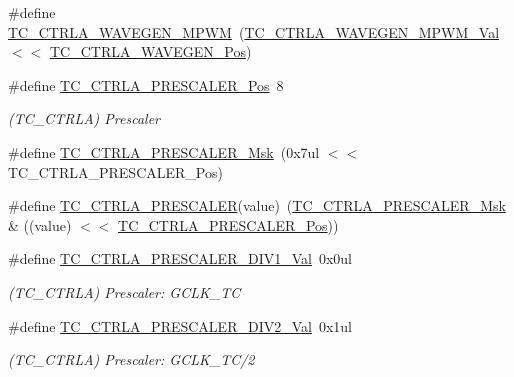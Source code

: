 \begin{DoxyCompactItemize}
\item 
\#define \mbox{\hyperlink{group___s_a_m_d21___t_c_gac9b02e2cfc519e0fc97c3b89efdc7be1}{T\+C\+\_\+\+C\+T\+R\+L\+A\+\_\+\+W\+A\+V\+E\+G\+E\+N\+\_\+\+M\+P\+WM}}~(\mbox{\hyperlink{group___s_a_m_d21___t_c_ga623755d8df9cf3e2381961022ac85349}{T\+C\+\_\+\+C\+T\+R\+L\+A\+\_\+\+W\+A\+V\+E\+G\+E\+N\+\_\+\+M\+P\+W\+M\+\_\+\+Val}}     $<$$<$ \mbox{\hyperlink{group___s_a_m_d21___t_c_gaba0fb608da3c78b2792cbc1be030ab27}{T\+C\+\_\+\+C\+T\+R\+L\+A\+\_\+\+W\+A\+V\+E\+G\+E\+N\+\_\+\+Pos}})
\item 
\#define \mbox{\hyperlink{group___s_a_m_d21___t_c_ga99d3a0239aaa0aecd6d8bec41fd4ce05}{T\+C\+\_\+\+C\+T\+R\+L\+A\+\_\+\+P\+R\+E\+S\+C\+A\+L\+E\+R\+\_\+\+Pos}}~8
\begin{DoxyCompactList}\small\item\em (T\+C\+\_\+\+C\+T\+R\+LA) Prescaler \end{DoxyCompactList}\item 
\#define \mbox{\hyperlink{group___s_a_m_d21___t_c_gad63c64ce39329e49a101ba680ed3a954}{T\+C\+\_\+\+C\+T\+R\+L\+A\+\_\+\+P\+R\+E\+S\+C\+A\+L\+E\+R\+\_\+\+Msk}}~(0x7ul $<$$<$ T\+C\+\_\+\+C\+T\+R\+L\+A\+\_\+\+P\+R\+E\+S\+C\+A\+L\+E\+R\+\_\+\+Pos)
\item 
\#define \mbox{\hyperlink{group___s_a_m_d21___t_c_gaa64e1b172a98651b7a198c8ab5be6fcd}{T\+C\+\_\+\+C\+T\+R\+L\+A\+\_\+\+P\+R\+E\+S\+C\+A\+L\+ER}}(value)~(\mbox{\hyperlink{group___s_a_m_d21___t_c_gad63c64ce39329e49a101ba680ed3a954}{T\+C\+\_\+\+C\+T\+R\+L\+A\+\_\+\+P\+R\+E\+S\+C\+A\+L\+E\+R\+\_\+\+Msk}} \& ((value) $<$$<$ \mbox{\hyperlink{group___s_a_m_d21___t_c_ga99d3a0239aaa0aecd6d8bec41fd4ce05}{T\+C\+\_\+\+C\+T\+R\+L\+A\+\_\+\+P\+R\+E\+S\+C\+A\+L\+E\+R\+\_\+\+Pos}}))
\item 
\#define \mbox{\hyperlink{group___s_a_m_d21___t_c_ga28845569709fb65583d42d7d6f75b2e5}{T\+C\+\_\+\+C\+T\+R\+L\+A\+\_\+\+P\+R\+E\+S\+C\+A\+L\+E\+R\+\_\+\+D\+I\+V1\+\_\+\+Val}}~0x0ul
\begin{DoxyCompactList}\small\item\em (T\+C\+\_\+\+C\+T\+R\+LA) Prescaler\+: G\+C\+L\+K\+\_\+\+TC \end{DoxyCompactList}\item 
\#define \mbox{\hyperlink{group___s_a_m_d21___t_c_gaf92d59ba84b5db292d193e94d73e0bc0}{T\+C\+\_\+\+C\+T\+R\+L\+A\+\_\+\+P\+R\+E\+S\+C\+A\+L\+E\+R\+\_\+\+D\+I\+V2\+\_\+\+Val}}~0x1ul
\begin{DoxyCompactList}\small\item\em (T\+C\+\_\+\+C\+T\+R\+LA) Prescaler\+: G\+C\+L\+K\+\_\+\+T\+C/2 \end{DoxyCompactList}\item 
$$
\end{DoxyCompactItemize}
